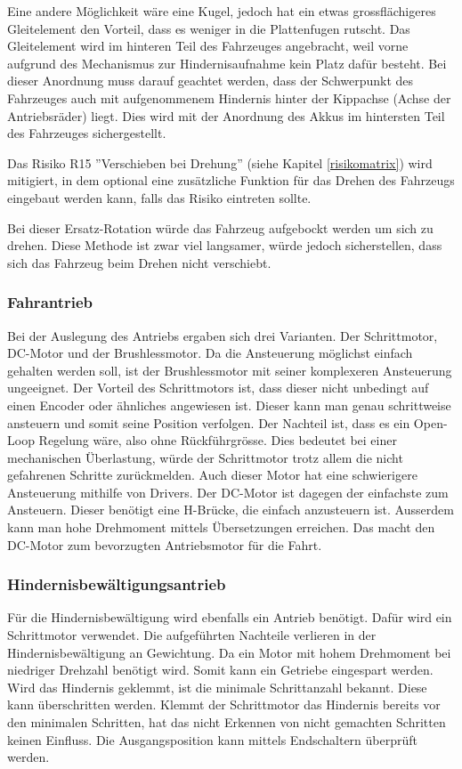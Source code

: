 \documentclass[../main.tex]{subfiles}
\begin{document}
Eine andere Möglichkeit wäre eine Kugel, jedoch hat ein etwas grossflächigeres Gleitelement den Vorteil, dass es weniger in die Plattenfugen rutscht. Das Gleitelement wird im hinteren Teil des Fahrzeuges angebracht, weil vorne aufgrund des Mechanismus zur Hindernisaufnahme kein Platz dafür besteht. Bei dieser Anordnung muss darauf geachtet werden, dass der Schwerpunkt des Fahrzeuges auch mit aufgenommenem Hindernis hinter der Kippachse (Achse der Antriebsräder) liegt. Dies wird mit der Anordnung des Akkus im hintersten Teil des Fahrzeuges sichergestellt.

Das Risiko R15 ''Verschieben bei Drehung'' (siehe Kapitel \ref{risikomatrix}) wird mitigiert,
in dem optional eine zusätzliche Funktion für das Drehen des Fahrzeugs eingebaut werden kann, falls das Risiko eintreten sollte.

Bei dieser Ersatz-Rotation würde das Fahrzeug aufgebockt werden um sich zu drehen.
Diese Methode ist zwar viel langsamer, würde jedoch sicherstellen, dass sich das Fahrzeug 
beim Drehen nicht verschiebt.

\subsubsection{Fahrantrieb}
\label{a3:Fahrantrieb}
Bei der Auslegung des Antriebs ergaben sich drei Varianten. Der Schrittmotor, DC-Motor und der Brushlessmotor. Da die Ansteuerung möglichst einfach gehalten werden soll, ist der Brushlessmotor mit seiner komplexeren Ansteuerung ungeeignet. Der Vorteil des Schrittmotors ist, dass dieser nicht unbedingt auf einen Encoder oder ähnliches angewiesen ist. Dieser kann man genau schrittweise ansteuern und somit seine Position verfolgen. Der Nachteil ist, dass es ein Open-Loop Regelung wäre, also ohne Rückführgrösse. Dies bedeutet bei einer mechanischen Überlastung, würde der Schrittmotor trotz allem die nicht gefahrenen Schritte zurückmelden. Auch dieser Motor hat eine schwierigere Ansteuerung mithilfe von Drivers. Der DC-Motor ist dagegen der einfachste zum Ansteuern. Dieser benötigt eine H-Brücke, die einfach anzusteuern ist. Ausserdem kann man hohe Drehmoment mittels Übersetzungen erreichen. Das macht den DC-Motor zum bevorzugten Antriebsmotor für die Fahrt.

\subsubsection{Hindernisbewältigungsantrieb}
\label{a3:Hindernisbewältigungsantrieb}
Für die Hindernisbewältigung wird ebenfalls ein Antrieb benötigt. Dafür wird ein Schrittmotor verwendet. Die aufgeführten Nachteile verlieren in der Hindernisbewältigung an Gewichtung. Da ein Motor mit hohem Drehmoment bei niedriger Drehzahl benötigt wird. Somit kann ein Getriebe eingespart werden. Wird das Hindernis geklemmt, ist die minimale Schrittanzahl bekannt. Diese kann überschritten werden. Klemmt der Schrittmotor das Hindernis bereits vor den minimalen Schritten, hat das nicht Erkennen von nicht gemachten Schritten keinen Einfluss. Die Ausgangsposition kann mittels Endschaltern überprüft werden.
  
\end{document}
